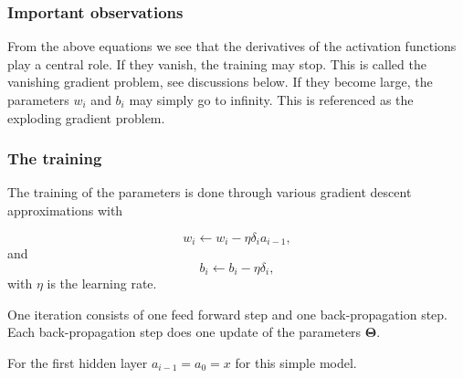 \documentclass{beamer}
\begin{document}
\begin{frame}
\frametitle{Important observations}

\begin{block}{}
From the above equations we see that the derivatives of the activation
functions play a central role. If they vanish, the training may
stop. This is called the vanishing gradient problem, see discussions below. If they become
large, the parameters $w_i$ and $b_i$ may simply go to infinity. This
is referenced as  the exploding gradient problem.
\end{block}
\end{frame}

\begin{frame}
\frametitle{The training}

The training of the parameters is done through various gradient descent approximations with

\[
w_{i}\leftarrow w_{i}- \eta \delta_i a_{i-1},
\]
and
\[
b_i \leftarrow b_i-\eta \delta_i,
\]
with $\eta$ is the learning rate.

One iteration consists of one feed forward step and one back-propagation step. Each back-propagation step does one update of the parameters $\bm{\Theta}$.

For the first hidden layer $a_{i-1}=a_0=x$ for this simple model.
\end{frame}
\end{document}
